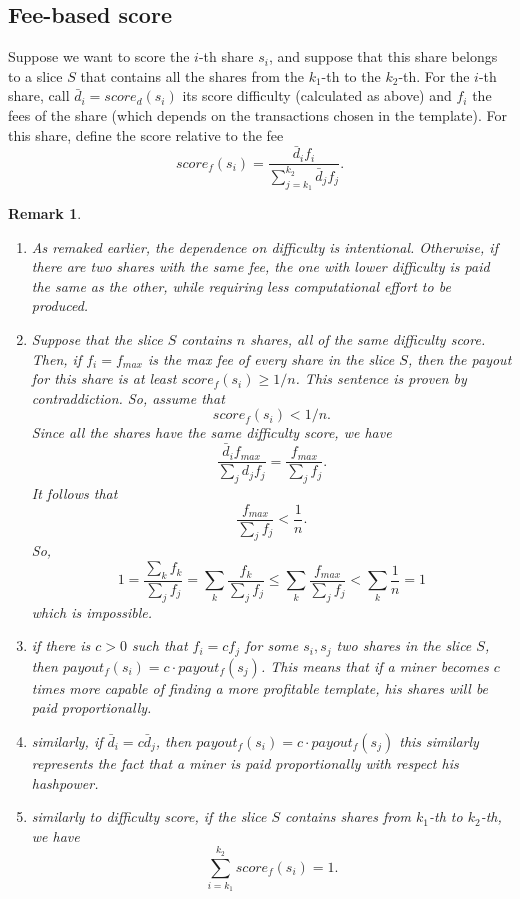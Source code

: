 \documentclass[11pt]{article}
\newtheorem{remark}{Remark}[subsection]
\begin{document}
\subsection{Fee-based score}
Suppose we want to score the $i$-th share $s_i$, and suppose that this share belongs to a slice $S$ that contains all the shares from the $k_1$-th to the $k_2$-th.
For the $i$-th share, call $\bar d_i = score_d(s_i)$ its score difficulty (calculated as above) and $f_i$ the fees of the share (which depends on the transactions chosen in the template). For this share, define the score relative to the fee
\[
score_f(s_i) = \frac{\bar d_if_i}{\sum_{j=k_1}^{k_2}\bar d_j f_j}.
\]
\begin{remark}\label{properties-diff-based-score}
\begin{enumerate} 
\item As remaked earlier, the dependence on difficulty is intentional. Otherwise, if there are two shares with the same fee, the one with lower difficulty is paid the same as the other, while requiring less computational effort to be produced.
\item Suppose that the slice $S$ contains $n$ shares, all of the same difficulty score. Then, if $f_i = f_{max}$ is the max fee of every share in the slice $S$, then the payout for this share is at least $score_f(s_i) \ge 1/n$. This sentence is proven by contraddiction. So, assume that 
\[score_f(s_i) < 1/n.\]
Since all the shares have the same difficulty score, we have 
\[\frac{\bar d_if_{max}}{\sum_j d_j f_j} = \frac{f_{max}}{\sum_j f_j}.\]It follows that
\[ \frac{f_{max}}{\sum_j f_j} <\frac{1} {n}.\]
So,
\[ 1 = \frac{\sum_k f_k}{\sum_j f_j} = \sum_k \frac {f_k}{\sum_j f_j} \le \sum_k \frac{f_{max}}{\sum_j f_j}<\sum_k\frac{1}{n} = 1\]
which is impossible.
\item if there is $c>0$ such that $f_i = cf_j$ for some $s_i, s_j$ two shares in the slice $S$, then $payout_f(s_i) = c \cdot payout_f(s_j)$. This means that if a miner becomes $c$ times more capable of finding a more profitable template, his shares will be paid proportionally.
\item similarly, if $\bar d_i = c \bar d_j$, then $payout_f(s_i) = c \cdot payout_f(s_j)$ this similarly represents the fact that a miner is paid proportionally with respect his hashpower.
\item similarly to difficulty score, if the slice $S$ contains shares from $k_1$-th to $k_2$-th, we have \[\sum_{i=k_1}^{k_2} score_f(s_i) = 1. \] \label{addstoone}
\end{enumerate}

\end{remark}
\end{document}
